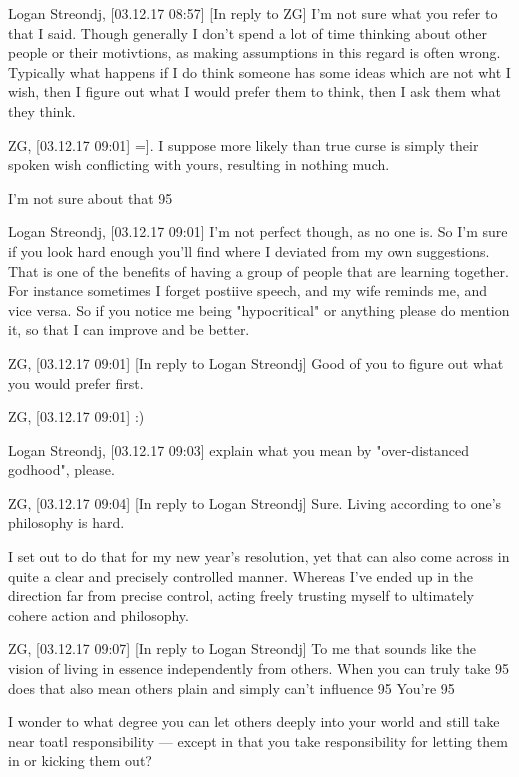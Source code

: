 Logan Streondj, [03.12.17 08:57]
[In reply to ZG]
I'm not sure what you refer to that I said.  Though generally I don't spend a
lot of time thinking about other people or their motivtions, as making
assumptions in this regard is often wrong. 
Typically what happens if I do think someone has some ideas which are not wht I
wish, 
then I figure out what I would prefer them to think,  then I ask them what they
think.

ZG, [03.12.17 09:01]
=]. I suppose more likely than true curse is simply their spoken wish
conflicting with yours, resulting in nothing much.

I'm not sure about that 95%

Logan Streondj, [03.12.17 09:01]
I'm not perfect though, as no one is. So I'm sure if you look hard enough you'll
find where I deviated from my own suggestions.
That is one of the benefits of having a group of people that are learning
together.  For instance sometimes I forget postiive speech, and my wife reminds
me, and vice versa. 
So if you notice me being "hypocritical" or anything please do mention it, so
that I can improve and be better.

ZG, [03.12.17 09:01]
[In reply to Logan Streondj]
Good of you to figure out what you would prefer first.

ZG, [03.12.17 09:01]
:)

Logan Streondj, [03.12.17 09:03]
explain what you mean by "over-distanced godhood", please.

ZG, [03.12.17 09:04]
[In reply to Logan Streondj]
Sure. Living according to one's philosophy is hard. 

I set out to do that for my new year's resolution, yet that can also come across
in quite a clear and precisely controlled manner. Whereas I've ended up in the
direction far from precise control, acting freely trusting myself to ultimately
cohere action and philosophy.

ZG, [03.12.17 09:07]
[In reply to Logan Streondj]
To me that sounds like the vision of living in essence independently from
others. When you can truly take 95%
does that also mean others plain and simply can't influence 95%
You're 95%

I wonder to what degree you can let others deeply into your world and still take
near toatl responsibility — except in that you take responsibility for letting
them in or kicking them out?


